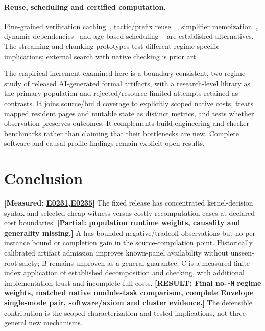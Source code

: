 \documentclass[10pt,twocolumn]{article}
\newcommand{\missing}[1]{\textbf{[RESULT: #1]}}
\newcommand{\measured}[1]{\textbf{[Measured: #1]}}
\newcommand{\partialev}[1]{\textbf{[Partial: #1]}}
\newcommand{\expref}[2]{\href{https://github.com/yunwei37/proofserve/blob/main/docs/tmp/build-and-evaluate/step-#1/step-report.md}{E#2}}
\begin{document}
\paragraph{Reuse, scheduling and certified computation.}
Fine-grained verification caching~\cite{boogieCache}, tactic/prefix reuse
~\cite{tactician2020,shred}, simplifier memoization~\cite{leanSimpCache},
dynamic dependencies~\cite{salsaDependencies,adapton} and age-based scheduling
~\cite{lubyRestart1993,soap2018} are established alternatives.
The streaming and chunking prototypes test different regime-specific
implications; external search with native checking is prior art.

The empirical increment examined here is a boundary-consistent, two-regime study of released
AI-generated formal artifacts, with a research-level library as the primary
population and rejected/resource-limited attempts retained as contrasts.
It joins source/build coverage to explicitly scoped native costs, treats
mapped resident pages and mutable state as distinct metrics, and tests
whether observation preserves outcomes.
It complements build engineering and checker benchmarks rather than claiming
that their bottlenecks are new. Complete software and causal-profile
findings remain explicit open results.


\section{Conclusion}
\measured{\expref{0231-20261101T001556+0000}{0231},\expref{0235-20261101T041713+0000}{0235}}
The fixed release has concentrated kernel-decision syntax and selected
cheap-witness versus costly-recomputation cases at declared cost boundaries.
\partialev{population runtime weights, causality and generality missing.}
A has bounded negative/tradeoff observations but no per-instance bound or
completion gain in the source-compilation point. Historically calibrated
artifact admission improves known-panel availability without unseen-root safety;
B remains unproven as a general guarantee.
C is a measured finite-index application of established decomposition
and checking, with additional implementation trust and incomplete full costs.
\missing{Final no-\texttt{-M} regime weights, matched native module-task
comparison, complete Envelope single-mode pair, software/axiom and cluster evidence.}
The defensible contribution is the scoped characterization and tested
implications, not three general new mechanisms.



\end{document}
